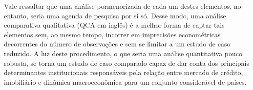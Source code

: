 Vale ressaltar que uma análise pormenorizada de cada um destes elementos, no entanto, seria uma agenda de pesquisa por si só. Desse modo, uma análise comparativa qualitativa (QCA em inglês) é a melhor forma de captar tais elementos sem, ao mesmo tempo, incorrer em imprecisões econométricas decorrentes do número de observações e sem se limitar a um estudo de caso reduzido. A luz deste procedimento, o que seria uma análise quantitativa pouco robusta, se torna um estudo de caso comparado capaz de dar conta dos principais determinantes institucionais responsáveis pela relação entre mercado de crédito, imobiliário e dinâmica macroeconômica para um conjunto considerável de países.


\begin{table}[htb]
	\centering
	\caption{Características institucionais de alguns países europeus}
	\label{Institucional}
\end{table}
